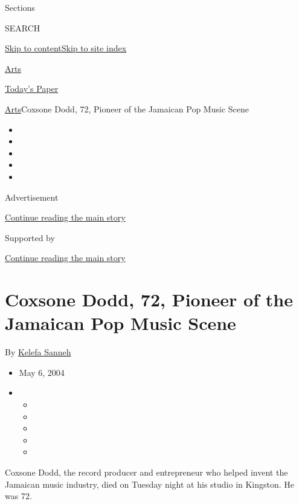 Sections

SEARCH

\protect\hyperlink{site-content}{Skip to
content}\protect\hyperlink{site-index}{Skip to site index}

\href{https://www.nytimes.com/section/arts}{Arts}

\href{https://myaccount.nytimes.com/auth/login?response_type=cookie\&client_id=vi}{}

\href{https://www.nytimes.com/section/todayspaper}{Today's Paper}

\href{/section/arts}{Arts}\textbar{}Coxsone Dodd, 72, Pioneer of the
Jamaican Pop Music Scene

\begin{itemize}
\item
\item
\item
\item
\item
\end{itemize}

Advertisement

\protect\hyperlink{after-top}{Continue reading the main story}

Supported by

\protect\hyperlink{after-sponsor}{Continue reading the main story}

\hypertarget{coxsone-dodd-72-pioneer-of-the-jamaican-pop-music-scene}{%
\section{Coxsone Dodd, 72, Pioneer of the Jamaican Pop Music
Scene}\label{coxsone-dodd-72-pioneer-of-the-jamaican-pop-music-scene}}

By \href{https://www.nytimes.com/by/kelefa-sanneh}{Kelefa Sanneh}

\begin{itemize}
\item
  May 6, 2004
\item
  \begin{itemize}
  \item
  \item
  \item
  \item
  \item
  \end{itemize}
\end{itemize}

Coxsone Dodd, the record producer and entrepreneur who helped invent the
Jamaican music industry, died on Tuesday night at his studio in
Kingston. He was 72.

